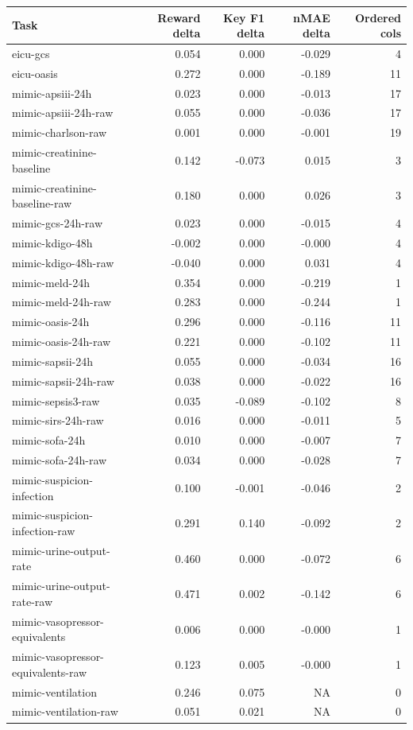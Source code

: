 \begin{tabular}{lrrrr}
\toprule
Task & Reward delta & Key F1 delta & nMAE delta & Ordered cols \\
\midrule
eicu-gcs & 0.054 & 0.000 & -0.029 & 4 \\
eicu-oasis & 0.272 & 0.000 & -0.189 & 11 \\
mimic-apsiii-24h & 0.023 & 0.000 & -0.013 & 17 \\
mimic-apsiii-24h-raw & 0.055 & 0.000 & -0.036 & 17 \\
mimic-charlson-raw & 0.001 & 0.000 & -0.001 & 19 \\
mimic-creatinine-baseline & 0.142 & -0.073 & 0.015 & 3 \\
mimic-creatinine-baseline-raw & 0.180 & 0.000 & 0.026 & 3 \\
mimic-gcs-24h-raw & 0.023 & 0.000 & -0.015 & 4 \\
mimic-kdigo-48h & -0.002 & 0.000 & -0.000 & 4 \\
mimic-kdigo-48h-raw & -0.040 & 0.000 & 0.031 & 4 \\
mimic-meld-24h & 0.354 & 0.000 & -0.219 & 1 \\
mimic-meld-24h-raw & 0.283 & 0.000 & -0.244 & 1 \\
mimic-oasis-24h & 0.296 & 0.000 & -0.116 & 11 \\
mimic-oasis-24h-raw & 0.221 & 0.000 & -0.102 & 11 \\
mimic-sapsii-24h & 0.055 & 0.000 & -0.034 & 16 \\
mimic-sapsii-24h-raw & 0.038 & 0.000 & -0.022 & 16 \\
mimic-sepsis3-raw & 0.035 & -0.089 & -0.102 & 8 \\
mimic-sirs-24h-raw & 0.016 & 0.000 & -0.011 & 5 \\
mimic-sofa-24h & 0.010 & 0.000 & -0.007 & 7 \\
mimic-sofa-24h-raw & 0.034 & 0.000 & -0.028 & 7 \\
mimic-suspicion-infection & 0.100 & -0.001 & -0.046 & 2 \\
mimic-suspicion-infection-raw & 0.291 & 0.140 & -0.092 & 2 \\
mimic-urine-output-rate & 0.460 & 0.000 & -0.072 & 6 \\
mimic-urine-output-rate-raw & 0.471 & 0.002 & -0.142 & 6 \\
mimic-vasopressor-equivalents & 0.006 & 0.000 & -0.000 & 1 \\
mimic-vasopressor-equivalents-raw & 0.123 & 0.005 & -0.000 & 1 \\
mimic-ventilation & 0.246 & 0.075 & NA & 0 \\
mimic-ventilation-raw & 0.051 & 0.021 & NA & 0 \\
\bottomrule
\end{tabular}
